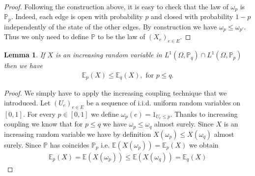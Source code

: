 \documentclass[12pt,a4paper]{article}
\newtheorem{lem}{Lemma}[section]
\theoremstyle{definition}
\begin{document}
\begin{proof}
Following the construction above, it is easy to check that the law of $\omega_p$ is $\mathbb{P}_p$. Indeed, each edge is open with probability $p$ and closed with probability $1-p$ independently of the state of the other edges. By construction we have $\omega_p \leq \omega_{p'}$. Thus we only need to define $\mathbb{P}$ to be the law of $(X_e)_{e \in E}$.
\end{proof}
\begin{lem} If $X$ is an increasing random variable in $L^1( \Omega, \mathbb{P}_q) \cap  L^1( \Omega, \mathbb{P}_p)$ then we have 
\begin{align*}
\mathbb{E}_p(X) \leq \mathbb{E}_q(X), \text{ for } p \leq q.
\end{align*}
\end{lem}
\begin{proof}
We simply have to apply the increasing coupling technique that we introduced. Let $(U_e)_{e \in E}$ be a sequence of i.i.d. uniform random variables on $[0,1]$. For every $p \in [0,1]$ we define $\omega_p(e) = 1_{U_e \leq p}$. Thanks to increasing coupling we know that for $p \leq q$ we have $\omega_p \leq \omega_{q}$ almost surely. Since $X$ is an increasing random variable we have by definition $X( \omega_p) \leq X(\omega_{q})$ almost surely. Since $\mathbb{P}$ has coincides $\mathbb{P}_p$ i.e. $\mathbb{E}(X( \omega_p))= \mathbb{E}_p(X)$ we obtain
\begin{align*}
\mathbb{E}_p(X) = \mathbb{E}(X( \omega_p)) \leq \mathbb{E}(X( \omega_{q})) = \mathbb{E}_{q} (X) 
\end{align*}
\end{proof}
\end{document}
